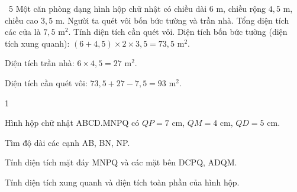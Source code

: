 \gap
\begin{exbox}{\ExWord\ 5}
Một căn phòng dạng hình hộp chữ nhật có chiều dài $6$ m, chiều rộng $4{,}5$ m, chiều cao $3{,}5$ m. Người ta quét vôi bốn bức tường và trần nhà. Tổng diện tích các cửa là $7{,}5$ m$^2$. Tính diện tích cần quét vôi.
\guide
Diện tích bốn bức tường (diện tích xung quanh): $(6+4{,}5)\times2\times3{,}5=73{,}5$ m$^2$.\par
Diện tích trần nhà: $6\times4{,}5=27$ m$^2$.\par
Diện tích cần quét vôi: $73{,}5+27-7{,}5=93$ m$^2$.
\end{exbox}
\begin{probbox}{1}{\relax}
\begin{minipage}[t]{0.58\linewidth}
Hình hộp chữ nhật ABCD.MNPQ có $QP=7$ cm, $QM=4$ cm, $QD=5$ cm.\par
{} Tìm độ dài các cạnh AB, BN, NP.\par
{} Tính diện tích mặt đáy MNPQ và các mặt bên DCPQ, ADQM.\par
{} Tính diện tích xung quanh và diện tích toàn phần của hình hộp.
\end{minipage}\hfill
\begin{minipage}[t]{0.38\linewidth}\vspace{0pt}\centering
{}
\end{minipage}
\end{probbox}
